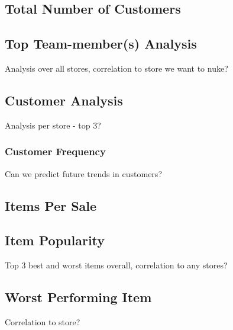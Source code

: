 \documentclass{article}
\begin{document}
            \subsection{Total Number of Customers}

            \subsection{Top Team-member(s) Analysis}
                Analysis over all stores, correlation to store we want to nuke?

            \subsection{Customer Analysis}
                Analysis per store - top 3?
                \subsubsection{Customer Frequency}
                    Can we predict future trends in customers? 

            \subsection{Items Per Sale}

            \subsection{Item Popularity}
                Top 3 best and worst items overall, correlation to any stores?

            \subsection{Worst Performing Item}
                Correlation to store?




	\newpage
\end{document}
